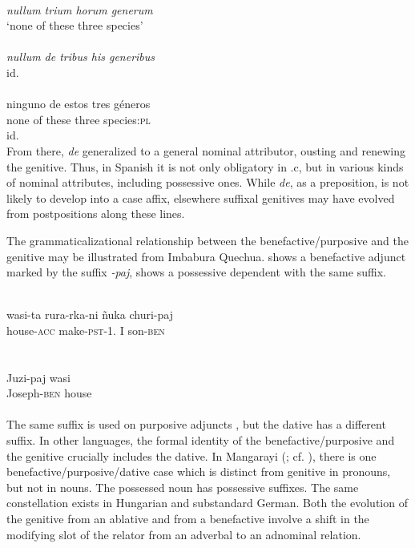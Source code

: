 \ea \label{ex:E46} 
\ea {} \\ 
{\itshape nullum trium horum generum}\\
\glt ‘none of these three species’\\
\ex  {} \\
{\itshape nullum de tribus his generibus}\\
\glt id. \\
\ex
{} \\
\gll  ninguno  de  estos  tres géneros \\
   none  of  these  three  species:\textsc{pl}  \\
 \glt id.\\
\z
\z
\noindent From there, \textit{de} generalized to a general nominal attributor, ousting and renewing the genitive. Thus, in Spanish it is not only obligatory in .c, but in various kinds of nominal attributes, including possessive ones. While \textit{de}, as a preposition, is not likely to develop into a case affix, elsewhere suffixal genitives may have evolved from postpositions along these lines.

The grammaticalizational relationship between the benefactive/purposive and the genitive may be illustrated from Imbabura Quechua.  shows a benefactive adjunct marked by the suffix \textit{{}-paj},  shows a possessive dependent with the same suffix.\label{page79}

\ea\label{ex:E47}
\\
\gll  wasi-ta  rura-rka-ni  ñuka  churi-paj\\
 house-\textsc{acc}  {make-\textsc{pst}-1.\glsg}  I  son-\textsc{ben}\\
\\
\z
\noindent \ea\label{ex:E48}
 \\
\gll   Juzi-paj  wasi\\
Joseph-\textsc{ben}  house\\
\\
\z
\noindent The same suffix is used on purposive adjuncts \citep[116f]{Cole1982}, but the dative has a different suffix. In other languages, the formal identity of the benefactive/purposive and the genitive crucially includes the dative. In Mangarayi (\citealt[66--76]{Merlan1982}; cf. ), there is one benefactive/purposive/dative case which is distinct from genitive in pronouns, but not in nouns. The possessed noun has possessive suffixes. The same constellation exists in Hungarian and substandard German. Both the evolution of the genitive from an ablative and from a benefactive involve a shift in the modifying slot of the relator from an adverbal to an adnominal relation.

